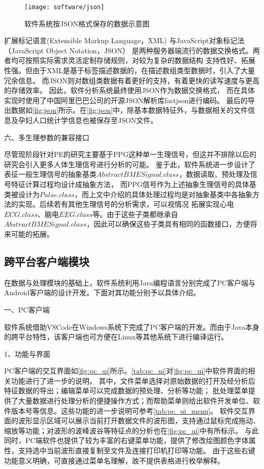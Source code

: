 \begin{figure}[htbp]
    \centering
    \texttt{[image: software/json]}
    \caption{\label{fig:json}软件系统按JSON格式保存的数据示意图}
\end{figure}

扩展标记语言(Extensible Markup Language，XML) \cite{xml,Li2016}与JavaScript对象标记法（JavaScript Object Notation，JSON）\cite{json,Crockford2006}
是两种服务器端流行的数据交换格式。两者均可按照实际需求灵活定制存储规则，对较为复杂的数据结构
支持性好、拓展性强。但由于XML是基于标签描述数据的，在描述数组类型数据时，引入了大量冗余信息。
而JSON则对数组类数据有着更好的支持，有着更快的读写速度与更高的存储效率\cite{Nurseitov2009}。
因此，软件分析系统最终使用JSON作为数据交换格式，
而在具体实现时使用了中国阿里巴巴公司的开源JSON解析库fastjson\cite{fastjson}进行编码。
最后的导出数据如\autoref{fig:json}所示。在\autoref{fig:json}中，除基本数据特征外，与数据相关的文件信息及孕妇人口统计学信息也被保存至JSON文件。

六、多生理参数的兼容接口

尽管现阶段针对PE的研究主要基于PPG这种单一生理信号，但这并不排除以后的研究会引入更多人体生理信号进行分析的可能。
鉴于此，软件系统进一步设计了表征一般生理信号的抽象基类$AbstractBMESignal.class$，数据读取、预处理及信号特征计算过程均设计成抽象方法，
而PPG信号作为上述抽象生理信号的具体基类被设计为$Pulse.class$，而上文中介绍的具体处理过程均是对抽象基类中各抽象方法的实现。后续若有其他生理信号的分析需求，可以视情况
拓展实现心电$ECG.class$、脑电$EEG.class$等。由于这些子类都继承自$AbstractBMESignal.class$，因此可以确保这些子类具有相同的函数接口，方便将来可能的拓展。

\subsection{跨平台客户端模块}

在数据与处理模块的基础上，软件系统利用Java编程语言分别完成了PC客户端与Android客户端的设计开发。下面对其功能分别予以具体介绍。

一、PC客户端

软件系统借助VSCode在Windows系统下完成了PC客户端的开发。而由于Java本身的跨平台特性，该客户端也可方便在Linux等其他系统下进行编译运行。

1、功能与界面

PC客户端的交互界面如\autoref{fig:pc_ui}所示。\autoref{tab:pc_ui}对\autoref{fig:pc_ui}中软件界面的相关功能进行了进一步的说明。
其中，文件菜单选择对原始数据的打开及经分析后特征数据的导出；编辑菜单可以完成数据的预处理、分析等功能；
批处理菜单提供了大量数据进行处理分析的便捷操作方式；而帮助菜单则给出软件开发单位、软件版本号等信息。这些功能的进一步说明可参考\autoref{tab:pc_ui_menu}。
软件交互界面的波形显示区域可以展示当前打开数据文件的波形图，支持通过鼠标完成拖动、缩放等功能；对波形的波峰波谷等特征点的分析也在\autoref{fig:pc_ui}中有所标示。
与此同时，PC端软件也提供了较为丰富的右键菜单功能，提供了修改绘图颜色字体属性，支持选中当前波形直接复制至文件及连接打印机打印等功能。
由于这些右键功能意义明确，可直接通过菜单名理解，故不提供表格进行枚举解释。

